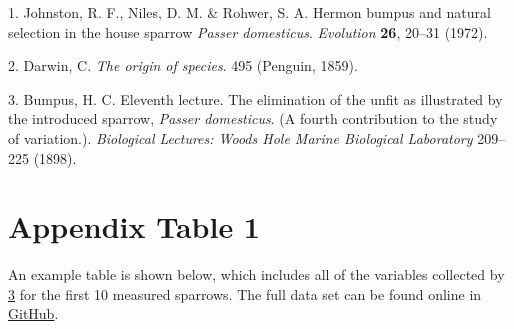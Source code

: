 \documentclass[
]{article}
\newenvironment{cslreferences}%
  {}%
  {\par}
\begin{document}
\hypertarget{refs}{}
\begin{cslreferences}
\leavevmode\hypertarget{ref-Johnston1972}{}%
1. Johnston, R. F., Niles, D. M. \& Rohwer, S. A. Hermon bumpus and natural selection in the house sparrow \emph{Passer domesticus}. \emph{Evolution} \textbf{26}, 20--31 (1972).

\leavevmode\hypertarget{ref-Darwin1859}{}%
2. Darwin, C. \emph{The origin of species}. 495 (Penguin, 1859).

\leavevmode\hypertarget{ref-Bumpus1898}{}%
3. Bumpus, H. C. Eleventh lecture. The elimination of the unfit as illustrated by the introduced sparrow, \emph{Passer domesticus}. (A fourth contribution to the study of variation.). \emph{Biological Lectures: Woods Hole Marine Biological Laboratory} 209--225 (1898).
\end{cslreferences}

\clearpage

\hypertarget{appendix-table-1}{%
\section{Appendix Table 1}\label{appendix-table-1}}

An example table is shown below, which includes all of the variables collected by \protect\hyperlink{ref-Bumpus1898}{3} for the first 10 measured sparrows. The full data set can be found online in \href{https://github.com/StirlingCodingClub/Manuscripts_in_Rmarkdown/blob/master/data/Bumpus_data.csv}{GitHub}.
\end{document}
